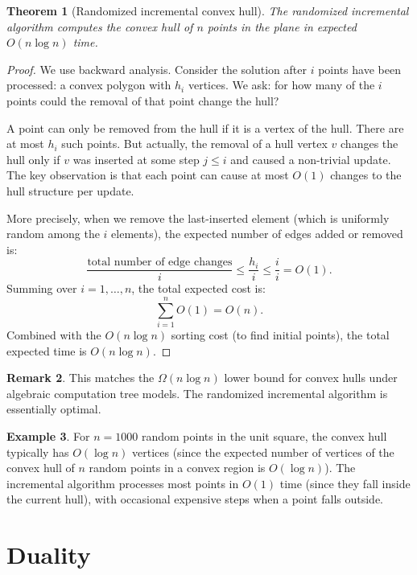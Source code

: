 \documentclass[twoside,12pt]{book}
\theoremstyle{plain}
\newtheorem{theorem}{Theorem}[chapter]
\theoremstyle{definition}
\newtheorem{example}[theorem]{Example}
\newtheorem{remark}[theorem]{Remark}
\theoremstyle{remark}
\begin{document}
\begin{theorem}[Randomized incremental convex hull]
\label{thm:convex-hull}
The randomized incremental algorithm computes the convex hull of $n$ points in the plane in expected $O(n \log n)$ time.
\end{theorem}

\begin{proof}
We use backward analysis. Consider the solution after $i$ points have been processed: a convex polygon with $h_i$ vertices. We ask: for how many of the $i$ points could the removal of that point change the hull?

A point can only be removed from the hull if it is a vertex of the hull. There are at most $h_i$ such points. But actually, the removal of a hull vertex $v$ changes the hull only if $v$ was inserted at some step $j \leq i$ and caused a non-trivial update. The key observation is that each point can cause at most $O(1)$ changes to the hull structure per update.

More precisely, when we remove the last-inserted element (which is uniformly random among the $i$ elements), the expected number of edges added or removed is:
\[
\frac{\text{total number of edge changes}}{i} \leq \frac{h_i}{i} \leq \frac{i}{i} = O(1).
\]
Summing over $i = 1, \ldots, n$, the total expected cost is:
\[
\sum_{i=1}^{n} O(1) = O(n).
\]
Combined with the $O(n \log n)$ sorting cost (to find initial points), the total expected time is $O(n \log n)$.
\end{proof}

\begin{remark}
This matches the $\Omega(n \log n)$ lower bound for convex hulls under algebraic computation tree models. The randomized incremental algorithm is essentially optimal.
\end{remark}

\begin{example}
For $n = 1000$ random points in the unit square, the convex hull typically has $O(\log n)$ vertices (since the expected number of vertices of the convex hull of $n$ random points in a convex region is $O(\log n)$). The incremental algorithm processes most points in $O(1)$ time (since they fall inside the current hull), with occasional expensive steps when a point falls outside.
\end{example}

\section{Duality}
\label{sec:duality}
\end{document}
